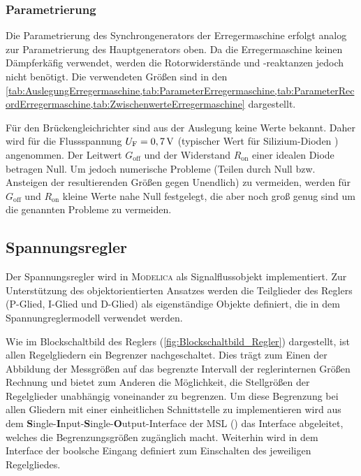 
\hypertarget{parametrierung-2}{%
\subsubsection{Parametrierung}\label{parametrierung-2}}

Die Parametrierung des Synchrongenerators der Erregermaschine erfolgt analog zur Parametrierung des Hauptgenerators oben. Da die Erregermaschine keinen Dämpferkäfig verwendet, werden die Rotorwiderstände und -reaktanzen jedoch nicht benötigt. Die verwendeten Größen sind in den  \cref{tab:AuslegungErregermaschine,tab:ParameterErregermaschine,tab:ParameterRecordErregermaschine,tab:ZwischenwerteErregermaschine} dargestellt.

Für den Brückengleichrichter sind aus der Auslegung keine Werte bekannt. Daher wird für die Flussspannung \(U_{\mathrm{F}}=\unit[0,7]{V}\) (typischer Wert für Silizium-Dioden \cite{??} ) angenommen. Der Leitwert \(G_{\mathrm{off}}\) und der Widerstand \(R_{\mathrm{on}}\) einer idealen Diode betragen Null. Um jedoch numerische Probleme (Teilen durch Null bzw. Ansteigen der resultierenden Größen gegen Unendlich) zu vermeiden, werden für \(G_{\mathrm{off}}\) und \(R_{\mathrm{on}}\) kleine Werte nahe Null festgelegt, die aber noch groß genug sind um die genannten Probleme zu vermeiden.
\subsection{Spannungsregler}\label{sec:Spannungsregler}
Der Spannungsregler wird in \textsc{Modelica} als Signalflussobjekt implementiert. Zur Unterstützung des objektorientierten Ansatzes werden die Teilglieder des Reglers (P-Glied, I-Glied und D-Glied) als eigenständige Objekte definiert, die in dem Spannungreglermodell verwendet werden.

Wie im Blockschaltbild des Reglers (\cref{fig:Blockschaltbild_Regler}) dargestellt, ist allen Regelgliedern ein Begrenzer nachgeschaltet. Dies trägt zum Einen der Abbildung der Messgrößen auf das begrenzte Intervall der reglerinternen Größen Rechnung und bietet zum Anderen die Möglichkeit, die Stellgrößen der Regelglieder unabhängig voneinander zu begrenzen. Um diese Begrenzung bei allen Gliedern mit einer einheitlichen Schnittstelle zu implementieren wird aus dem \textbf{S}ingle-\textbf{I}nput-\textbf{S}ingle-\textbf{O}utput-Interface der MSL () das Interface  abgeleitet, welches die Begrenzungsgrößen zugänglich macht. Weiterhin wird in dem Interface der boolsche Eingang  definiert zum Einschalten des jeweiligen Regelgliedes.­

